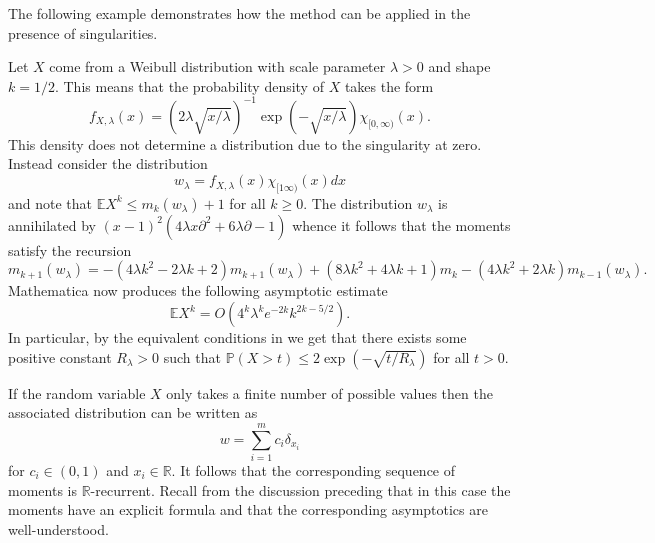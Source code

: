 The following example demonstrates how the method can be applied in the presence of singularities.
\begin{example}
  Let $X$ come from a Weibull distribution with scale parameter $\lambda>0$ and shape $k = 1/2$.
  This means that the probability density of $X$ takes the form
  $$f_{X,\lambda}(x) = (2 \lambda \sqrt{x/\lambda})^{-1}\exp(-\sqrt{x/\lambda})\chi_{[0,\infty)}(x).$$
  This density does not determine a distribution due to the singularity at zero.
  Instead consider the distribution
  $$w_\lambda = f_{X,\lambda}(x)\chi_{[1\infty)}(x)dx $$
  and note that $\mathbb{E}X^k \leq m_k(w_\lambda) + 1$ for all $k\geq 0$.
  The distribution $w_\lambda$ is annihilated by $(x-1)^2(4 \lambda x \partial^2 + 6\lambda\partial - 1)$
  whence it follows that the moments satisfy the recursion
  $$m_{k+1}(w_\lambda) = -(4\lambda k^2 - 2\lambda k + 2)m_{k+1}(w_\lambda) + (8\lambda k^2 + 4\lambda k + 1)m_k - (4\lambda k^2 + 2\lambda k)m_{k-1}(w_\lambda).$$
  Mathematica now produces the following asymptotic estimate
  $$\mathbb{E}X^k = O\left(4^k\lambda^k e^{-2k}k^{2k -5/2}\right).$$
  In particular, by the equivalent conditions in  we get that there exists some positive constant $R_\lambda>0$ such that  $\mathbb{P}(X>t) \leq 2\exp(- \sqrt{t/R_\lambda}) $ for all $t>0$.
\end{example}
\begin{remark}
  If the random variable $X$ only takes a finite number of possible values then the associated distribution can be written as
  $$w = \sum_{i=1}^m c_i \delta_{x_i}$$
  for $c_i\in (0,1)$ and $x_i\in \mathbb{R}$.
  It follows that the corresponding sequence of moments is $\mathbb{R}$-recurrent.
  Recall from the discussion preceding  that in this case the moments have an explicit formula and that the corresponding asymptotics are well-understood.
\end{remark}
